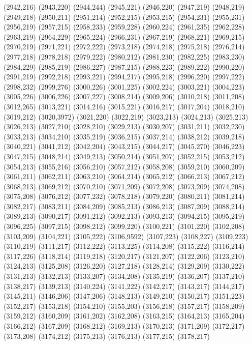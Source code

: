 (2942,216)
(2943,220)
(2944,244)
(2945,221)
(2946,220)
(2947,219)
(2948,219)
(2949,218)
(2950,211)
(2951,214)
(2952,215)
(2953,215)
(2954,231)
(2955,231)
(2956,219)
(2957,215)
(2958,233)
(2959,228)
(2960,224)
(2961,235)
(2962,228)
(2963,219)
(2964,229)
(2965,224)
(2966,231)
(2967,219)
(2968,221)
(2969,215)
(2970,219)
(2971,221)
(2972,222)
(2973,218)
(2974,218)
(2975,218)
(2976,214)
(2977,218)
(2978,218)
(2979,222)
(2980,212)
(2981,230)
(2982,225)
(2983,230)
(2984,229)
(2985,219)
(2986,227)
(2987,215)
(2988,223)
(2989,222)
(2990,220)
(2991,219)
(2992,218)
(2993,221)
(2994,217)
(2995,218)
(2996,220)
(2997,222)
(2998,232)
(2999,276)
(3000,226)
(3001,225)
(3002,224)
(3003,221)
(3004,223)
(3005,226)
(3006,226)
(3007,227)
(3008,214)
(3009,206)
(3010,218)
(3011,208)
(3012,265)
(3013,221)
(3014,216)
(3015,221)
(3016,217)
(3017,204)
(3018,210)
(3019,212)
(3020,3972)
(3021,220)
(3022,219)
(3023,213)
(3024,213)
(3025,213)
(3026,213)
(3027,210)
(3028,210)
(3029,213)
(3030,207)
(3031,211)
(3032,230)
(3033,213)
(3034,210)
(3035,219)
(3036,215)
(3037,214)
(3038,212)
(3039,218)
(3040,221)
(3041,212)
(3042,204)
(3043,215)
(3044,217)
(3045,270)
(3046,223)
(3047,215)
(3048,214)
(3049,213)
(3050,214)
(3051,207)
(3052,215)
(3053,212)
(3054,213)
(3055,216)
(3056,210)
(3057,212)
(3058,208)
(3059,210)
(3060,209)
(3061,211)
(3062,211)
(3063,210)
(3064,214)
(3065,212)
(3066,213)
(3067,212)
(3068,213)
(3069,212)
(3070,210)
(3071,209)
(3072,208)
(3073,209)
(3074,208)
(3075,208)
(3076,212)
(3077,232)
(3078,218)
(3079,220)
(3080,211)
(3081,214)
(3082,217)
(3083,211)
(3084,209)
(3085,213)
(3086,213)
(3087,209)
(3088,214)
(3089,213)
(3090,217)
(3091,212)
(3092,213)
(3093,213)
(3094,215)
(3095,219)
(3096,225)
(3097,215)
(3098,212)
(3099,220)
(3100,221)
(3101,220)
(3102,208)
(3103,209)
(3104,221)
(3105,222)
(3106,9592)
(3107,223)
(3108,227)
(3109,223)
(3110,219)
(3111,217)
(3112,222)
(3113,225)
(3114,208)
(3115,222)
(3116,214)
(3117,226)
(3118,214)
(3119,218)
(3120,217)
(3121,207)
(3122,206)
(3123,210)
(3124,213)
(3125,208)
(3126,220)
(3127,218)
(3128,214)
(3129,209)
(3130,222)
(3131,213)
(3132,213)
(3133,207)
(3134,208)
(3135,219)
(3136,207)
(3137,210)
(3138,217)
(3139,213)
(3140,224)
(3141,222)
(3142,217)
(3143,217)
(3144,217)
(3145,211)
(3146,206)
(3147,206)
(3148,213)
(3149,210)
(3150,217)
(3151,223)
(3152,217)
(3153,218)
(3154,210)
(3155,203)
(3156,218)
(3157,217)
(3158,209)
(3159,212)
(3160,209)
(3161,202)
(3162,208)
(3163,215)
(3164,213)
(3165,204)
(3166,212)
(3167,209)
(3168,212)
(3169,213)
(3170,213)
(3171,209)
(3172,217)
(3173,208)
(3174,212)
(3175,213)
(3176,213)
(3177,215)
(3178,217)
